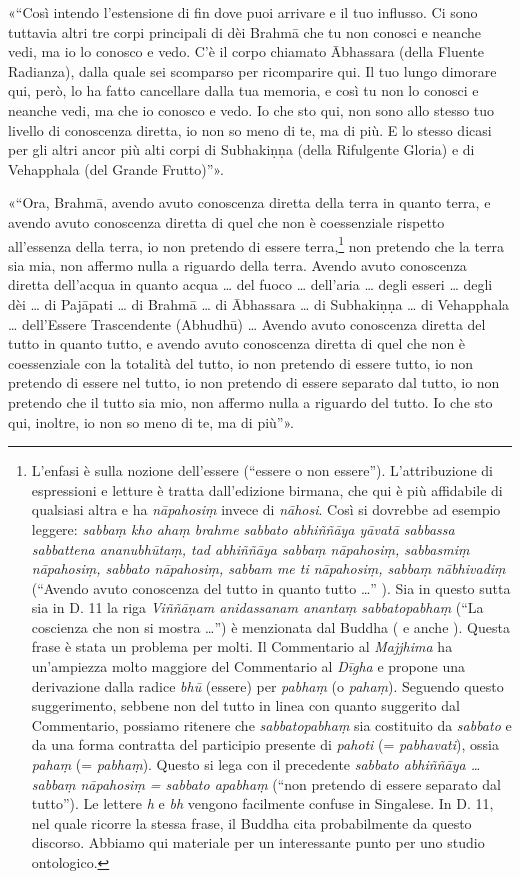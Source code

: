 «“Così intendo l’estensione di fin dove puoi arrivare e il tuo influsso. Ci sono
tuttavia altri tre corpi principali di dèi Brahmā che tu non conosci e neanche
vedi, ma io lo conosco e vedo. C’è il corpo chiamato Ābhassara (della Fluente
Radianza), dalla quale sei scomparso per ricomparire qui. Il tuo lungo dimorare
qui, però, lo ha fatto cancellare dalla tua memoria, e così tu non lo conosci e
neanche vedi, ma che io conosco e vedo. Io che sto qui, non sono allo stesso tuo
livello di conoscenza diretta, io non so meno di te, ma di più. E lo stesso
dicasi per gli altri ancor più alti corpi di Subhakiṇṇa (della Rifulgente
Gloria) e di Vehapphala (del Grande Frutto)”».

«“Ora, Brahmā, avendo avuto conoscenza diretta della terra in quanto terra, e
avendo avuto conoscenza diretta di quel che non è coessenziale rispetto
all’essenza della terra, io non pretendo di essere terra,\footnote{L’enfasi è
  sulla nozione dell’essere (“essere o non essere”). L’attribuzione di
  espressioni e letture è tratta dall’edizione birmana, che qui è più affidabile
  di qualsiasi altra e ha \emph{nāpahosiṃ} invece di \emph{nāhosi}. Così si
  dovrebbe ad esempio leggere: \emph{sabbaṃ kho ahaṃ brahme sabbato abhiññāya
    yāvatā sabbassa sabbattena ananubhūtaṃ, tad abhiññāya sabbaṃ nāpahosiṃ,
    sabbasmiṃ nāpahosiṃ, sabbato nāpahosiṃ, sabbam me ti nāpahosiṃ, sabbaṃ
    nābhivadiṃ} (“Avendo avuto conoscenza del tutto in quanto tutto …” ). Sia in
  questo sutta sia in D. 11 la riga \emph{Viññāṇam anidassanam anantaṃ
    sabbatopabhaṃ} (“La coscienza che non si mostra …”) è menzionata dal Buddha
  (\hyperlink{pag162}{} e anche \hyperlink{pag167}{}). Questa frase è stata un
  problema per molti. Il Commentario al \emph{Majjhima} ha un’ampiezza molto
  maggiore del Commentario al \emph{Dīgha} e propone una derivazione dalla
  radice \emph{bhū} (essere) per \emph{pabhaṃ} (o \emph{pahaṃ}). Seguendo questo
  suggerimento, sebbene non del tutto in linea con quanto suggerito dal
  Commentario, possiamo ritenere che \emph{sabbatopabhaṃ} sia costituito da
  \emph{sabbato} e da una forma contratta del participio presente di
  \emph{pahoti} (= \emph{pabhavati}), ossia \emph{pahaṃ} (= \emph{pabhaṃ}).
  Questo si lega con il precedente \emph{sabbato abhiññāya … sabbaṃ nāpahosiṃ =
    sabbato apabhaṃ} (“non pretendo di essere separato dal tutto”). Le lettere
  \emph{h} e \emph{bh} vengono facilmente confuse in Singalese. In D. 11, nel
  quale ricorre la stessa frase, il Buddha cita probabilmente da questo
  discorso. Abbiamo qui materiale per un interessante punto per uno studio
  ontologico.} non pretendo che la terra sia mia, non affermo nulla a riguardo
della terra. Avendo avuto conoscenza diretta dell’acqua in quanto acqua … del
fuoco … dell’aria … degli esseri … degli dèi … di Pajāpati … di Brahmā … di
Ābhassara … di Subhakiṇṇa … di Vehapphala … dell’Essere Trascendente (Abhudhū) …
Avendo avuto conoscenza diretta del tutto in quanto tutto, e avendo avuto
conoscenza diretta di quel che non è coessenziale con la totalità del tutto, io
non pretendo di essere tutto, io non pretendo di essere nel tutto, io non
pretendo di essere separato dal tutto, io non pretendo che il tutto sia mio, non
affermo nulla a riguardo del tutto. Io che sto qui, inoltre, io non so meno di
te, ma di più”».

